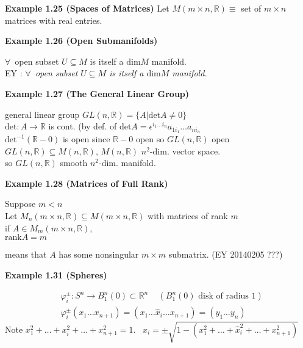 \textbf{Example 1.25 (Spaces of Matrices) } Let $M(m\times n,\mathbb{R}) \equiv $ set of $m\times n$ matrices with real entries.  

\textbf{Example 1.26 (Open Submanifolds)}

$\forall \, $ open subset $U \subseteq M$ is itself a $\text{dim}{M}$ manifold. \\
EY : \emph{ $\forall \, $ open subset $U \subseteq M$ is itself a $\text{dim}{M}$ manifold. }


\textbf{Example 1.27 (The General Linear Group) }

general linear group $GL(n,\mathbb{R}) = \lbrace A | \text{det}{A} \neq 0 \rbrace$ \\
\quad $\text{det}:A \to \mathbb{R}$ is cont. (by def. of $\text{det}{A} = \epsilon^{ i_1 \dots i_n}a_{1 i_1} \dots a_{n i_n}$ \\
\quad $\text{det}^{-1}{ ( \mathbb{R} - 0 )}$ is open since $\mathbb{R}-0$ open so $GL(n,\mathbb{R})$ open \\
\quad $GL(n,\mathbb{R}) \subseteq M(n,\mathbb{R})$, $M(n,\mathbb{R})$ $n^2$-dim. vector space. \\
\quad \quad so $GL(n,\mathbb{R})$ smooth $n^2$-dim. manifold.  

\textbf{Example 1.28 (Matrices of Full Rank)}

Suppose $m <n$ \\

Let $M_n(m\times n, \mathbb{R}) \subseteq M(m\times n, \mathbb{R})$ with matrices of rank $m$ \\
if $A \in M_m(m\times n, \mathbb{R})$, \\
\quad $\text{rank}{A}=m$ 

means that $A$ has some nonsingular $m \times m$ submatrix.  (EY 20140205 ???)




\textbf{Example 1.31 (Spheres)} 

\[
\begin{aligned}
  & \varphi_i^{\pm} : S^n \to B_1^n(0) \subset \mathbb{R}^n \quad \, (B_1^n(0) \text{ disk of radius $1$}) \\
  & \varphi_i^{\pm}(x_1 \dots x_{n+1}) = (x_1 \dots \widehat{x}_i \dots x_{n+1} )= (y_1 \dots y_n)
\end{aligned}
\]
Note $x_1^2 + \dots + x_i^2 + \dots + x_{n+1}^2 = 1$.  \quad \, $x_i = \pm \sqrt{ 1 - (x_1^2 + \dots + \widehat{x}_i^2 + \dots + x_{n+1}^2 ) }$

